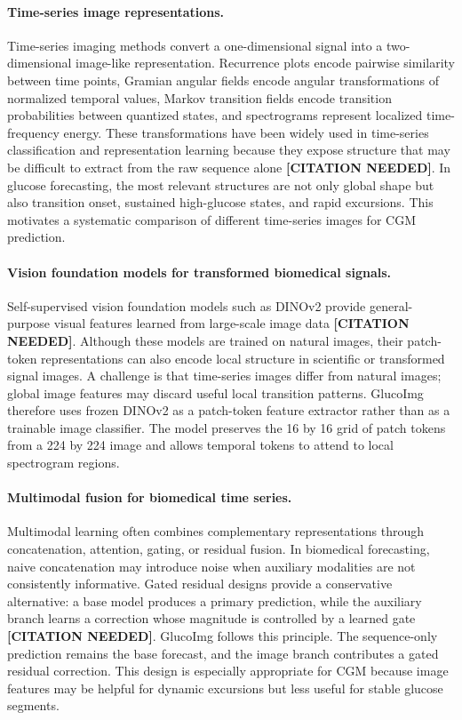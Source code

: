 \documentclass[11pt]{article}
\begin{document}
\paragraph{Time-series image representations.}
Time-series imaging methods convert a one-dimensional signal into a two-dimensional image-like representation. Recurrence plots encode pairwise similarity between time points, Gramian angular fields encode angular transformations of normalized temporal values, Markov transition fields encode transition probabilities between quantized states, and spectrograms represent localized time-frequency energy. These transformations have been widely used in time-series classification and representation learning because they expose structure that may be difficult to extract from the raw sequence alone \textbf{[CITATION NEEDED]}. In glucose forecasting, the most relevant structures are not only global shape but also transition onset, sustained high-glucose states, and rapid excursions. This motivates a systematic comparison of different time-series images for CGM prediction.

\paragraph{Vision foundation models for transformed biomedical signals.}
Self-supervised vision foundation models such as DINOv2 provide general-purpose visual features learned from large-scale image data \textbf{[CITATION NEEDED]}. Although these models are trained on natural images, their patch-token representations can also encode local structure in scientific or transformed signal images. A challenge is that time-series images differ from natural images; global image features may discard useful local transition patterns. GlucoImg therefore uses frozen DINOv2 as a patch-token feature extractor rather than as a trainable image classifier. The model preserves the 16 by 16 grid of patch tokens from a 224 by 224 image and allows temporal tokens to attend to local spectrogram regions.

\paragraph{Multimodal fusion for biomedical time series.}
Multimodal learning often combines complementary representations through concatenation, attention, gating, or residual fusion. In biomedical forecasting, naive concatenation may introduce noise when auxiliary modalities are not consistently informative. Gated residual designs provide a conservative alternative: a base model produces a primary prediction, while the auxiliary branch learns a correction whose magnitude is controlled by a learned gate \textbf{[CITATION NEEDED]}. GlucoImg follows this principle. The sequence-only prediction remains the base forecast, and the image branch contributes a gated residual correction. This design is especially appropriate for CGM because image features may be helpful for dynamic excursions but less useful for stable glucose segments.
\end{document}
